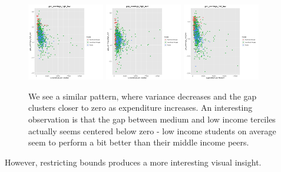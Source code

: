 \documentclass{article}
\begin{document}
\begin{figure}[H]
\centering
\includegraphics[width=0.3\textwidth]{../images/eda_scatterplots/gap_earnings_high_low.png}
\includegraphics[width=0.3\textwidth]{../images/eda_scatterplots/gap_earnings_high_mid.png}
\includegraphics[width=0.3\textwidth]{../images/eda_scatterplots/gap_earnings_mid_low.png}
\caption{\label{fig:FullEarnings} We see a similar pattern, where variance decreases and the gap clusters closer to zero as expenditure increases. An interesting observation is that the gap between medium and low income terciles actually seems centered below zero - low income students on average seem to perform a bit better than their middle income peers.}
\end{figure}

However, restricting bounds produces a more interesting visual insight.
\end{document}
